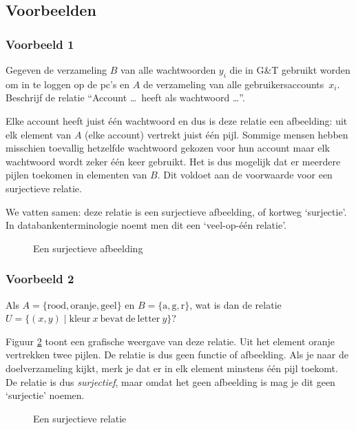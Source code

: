 \subsection{Voorbeelden}
\subsubsection*{Voorbeeld 1}
Gegeven de verzameling $B$ van alle wachtwoorden $y_i$ die in G\&T gebruikt worden om in te loggen op de pc's en $A$ de verzameling van alle ge\-brui\-kers\-accounts~$x_i$. Beschrijf de relatie ``Account \ldots \ heeft als wachtwoord \ldots ''.

Elke account heeft juist één wachtwoord en dus is deze relatie een afbeelding: uit elk element van $A$ (elke account) vertrekt juist één pijl.
Sommige mensen hebben misschien toevallig hetzelfde wachtwoord gekozen voor hun account maar elk wachtwoord wordt zeker één keer gebruikt. Het is dus mogelijk dat er meerdere pijlen toekomen in elementen van $B$. Dit voldoet aan de voorwaarde voor een surjectieve relatie.

We vatten samen: deze relatie is een surjectieve afbeelding, of kortweg `surjectie'. In databankenterminologie noemt men dit een `veel-op-één relatie'.
\begin{figure}[htbp]
\centering
    
\caption{Een surjectieve afbeelding}
\label{fig:surjectie}
\end{figure}


\subsubsection*{Voorbeeld 2}
Als $A=\{\mathrm{rood},\mathrm{oranje},\mathrm{geel}\}$ en $B=\{\mathrm{a},\mathrm{g},\mathrm{r}\}$, wat is dan de relatie $U=\{({x},{y})\mid \mathrm{kleur~}x\mathrm{~bevat~de~letter~}y\}$?

Figuur \ref{fig:surjectieverel} toont een grafische weergave van deze relatie. Uit het element oranje vertrekken twee pijlen. De relatie is dus geen functie of afbeelding. Als je naar de doelverzameling kijkt, merk je dat er in elk element minstens één pijl toekomt. De relatie is dus \emph{surjectief}, maar omdat het geen afbeelding is mag je dit geen  `surjectie' noemen.
\begin{figure}[htbp]
\centering
    
\caption{Een surjectieve relatie}
\label{fig:surjectieverel}
\end{figure}


